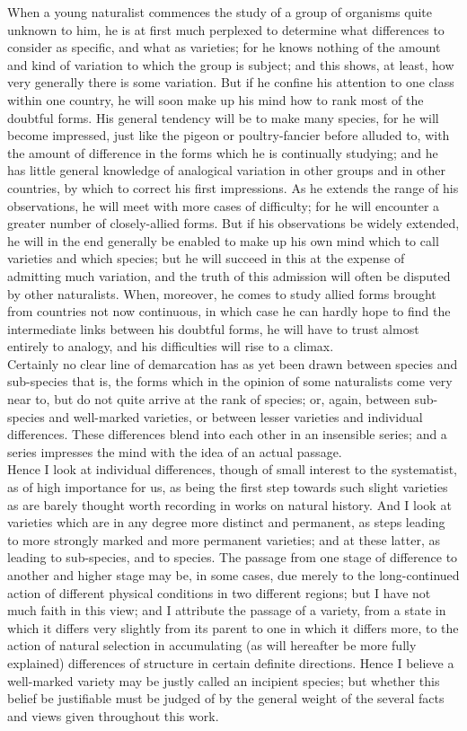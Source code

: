 \indent When a young naturalist commences the study of a group of organisms quite unknown to him, he is at first much perplexed to determine what differences to consider as specific, and what as varieties; for he knows nothing of the amount and kind of variation to which the group is subject; and this shows, at least, how very generally there is some variation. But if he confine his attention to one class within one country, he will soon make up his mind how to rank most of the doubtful forms. His general tendency will be to make many species, for he will become impressed, just like the pigeon or poultry-fancier before alluded to, with the amount of difference in the forms which he is continually studying; and he has little general knowledge of analogical variation in other groups and in other countries, by which to correct his first impressions. As he extends the range of his observations, he will meet with more cases of difficulty; for he will encounter a greater number of closely-allied forms. But if his observations be widely extended, he will in the end generally be enabled to make up his own mind which to call varieties and which species; but he will succeed in this at the expense of admitting much variation, and the truth of this admission will often be disputed by other naturalists. When, moreover, he comes to study allied forms brought from countries not now continuous, in which case he can hardly hope to find the intermediate links between his doubtful forms, he will have to trust almost entirely to analogy, and his difficulties will rise to a climax. \\
\indent Certainly no clear line of demarcation has as yet been drawn between species and sub-species that is, the forms which in the opinion of some naturalists come very near to, but do not quite arrive at the rank of species; or, again, between sub-species and well-marked varieties, or between lesser varieties and individual differences. These differences blend into each other in an insensible series; and a series impresses the mind with the idea of an actual passage. \\
\indent Hence I look at individual differences, though of small interest to the systematist, as of high importance for us, as being the first step towards such slight varieties as are barely thought worth recording in works on natural history.  And I look at varieties which are in any degree more distinct and permanent, as steps leading to more strongly marked and more permanent varieties; and at these latter, as leading to sub-species, and to species. The passage from one stage of difference to another and higher stage may be, in some cases, due merely to the long-continued action of different physical conditions in two different regions; but I have not much faith in this view; and I attribute the passage of a variety, from a state in which it differs very slightly from its parent to one in which it differs more, to the action of natural selection in accumulating (as will hereafter be more fully explained) differences of structure in certain definite directions. Hence I believe a well-marked variety may be justly called an incipient species; but whether this belief be justifiable must be judged of by the general weight of the several facts and views given throughout this work. \\
